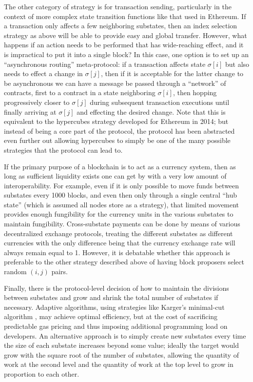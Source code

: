 \documentclass[11pt,a4paper]{report}
\theoremstyle{plain}
\theoremstyle{definition}
\theoremstyle{remark}
\begin{document}
The other category of strategy is for transaction sending, particularly in the context of more complex state transition functions like that used in Ethereum. If a transaction only affects a few neighboring substates, then an index selection strategy as above will be able to provide easy and global transfer. However, what happens if an action needs to be performed that has wide-reaching effect, and it is impractical to put it into a single block? In this case, one option is to set up an ``asynchronous routing'' meta-protocol: if a transaction affects state $\sigma[i]$ but also needs to effect a change in $\sigma[j]$, then if it is acceptable for the latter change to be asynchronous we can have a message be passed through a ``network'' of contracts, first to a contract in a state neighboring $\sigma[i]$, then hopping progressively closer to $\sigma[j]$ during subsequent transaction executions until finally arriving at $\sigma[j]$ and effecting the desired change. Note that this is equivalent to the hypercubes \cite{hypercubes} strategy developed for Ethereum in 2014; but instead of being a core part of the protocol, the protocol has been abstracted even further out allowing hypercubes to simply be one of the many possible strategies that the protocol can lead to.

If the primary purpose of a blockchain is to act as a currency system, then as long as sufficient liquidity exists one can get by with a very low amount of interoperability. For example, even if it is only possible to move funds between substates every 1000 blocks, and even then only through a single central ``hub state'' (which is assumed all nodes store as a strategy), that limited movement provides enough fungibility for the currency units in the various substates to maintain fungibility. Cross-substate payments can be done by means of various decentralized exchange protocols, treating the different substates as different currencies with the only difference being that the currency exchange rate will always remain equal to 1. However, it is debatable whether this approach is preferable to the other strategy described above of having block proposers select random $(i, j)$ pairs.

Finally, there is the protocol-level decision of how to maintain the divisions between substates and grow and shrink the total number of substates if necessary. Adaptive algorithms, using strategies like Karger's minimal-cut algorithm \cite{karger}, may achieve optimal efficiency, but at the cost of sacrificing predictable gas pricing and thus imposing additional programming load on developers. An alternative approach is to simply create new substates every time the size of each substate increases beyond some value; ideally the target would grow with the square root of the number of substates, allowing the quantity of work at the second level and the quantity of work at the top level to grow in proportion to each other.
\end{document}
